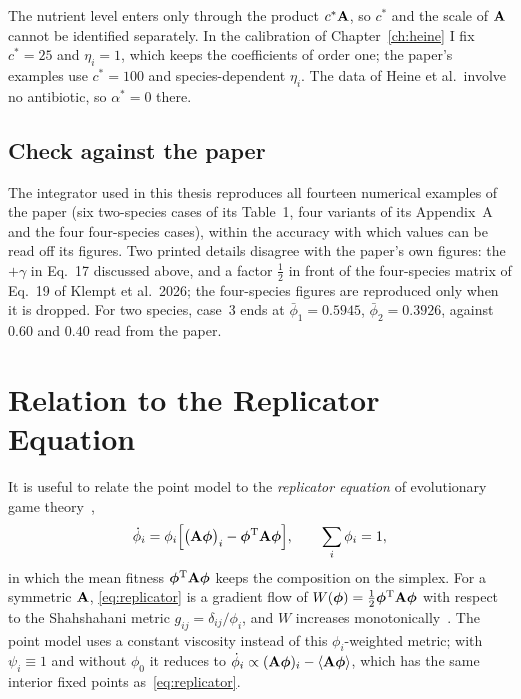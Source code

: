 The nutrient level enters only through the product $c^*\mathbf{A}$, so $c^*$ and the
scale of $\mathbf{A}$ cannot be identified separately. In the calibration of
Chapter~\ref{ch:heine} I fix $c^*=25$ and $\eta_i=1$, which keeps the
coefficients of order one; the paper's examples use $c^*=100$ and
species-dependent $\eta_i$. The data of Heine et al.\ involve no antibiotic,
so $\alpha^*=0$ there.

\subsection{Check against the paper}
\label{sec:theory_point_check}

The integrator used in this thesis reproduces all fourteen numerical examples
of the paper (six two-species cases of its Table~1, four variants of its
Appendix~A and the four four-species cases), within the accuracy with which
values can be read off its figures. Two printed details disagree with the
paper's own figures: the $+\gamma$ in Eq.~17 discussed above, and a factor
$\tfrac12$ in front of the four-species matrix of Eq.~19 of Klempt et al.\ 2026;
the four-species figures are reproduced only when it is dropped. For two species, case~3 ends at
$\bar\phi_1=0.5945$, $\bar\phi_2=0.3926$, against $0.60$ and $0.40$ read
from the paper.

\section{Relation to the Replicator Equation}
\label{sec:theory_replicator}

It is useful to relate the point model to the \emph{replicator equation} of
evolutionary game theory~\cite{Hofbauer1998EGT,TaylorJonker1978Replicator},
\begin{equation}
  \dot{\phi}_i = \phi_i \Bigl[ \bigl(\mathbf{A}\boldsymbol{\phi}\bigr)_i - \boldsymbol{\phi}^{\rm T} \mathbf{A} \boldsymbol{\phi} \Bigr],
  \qquad \sum_i \phi_i = 1,
  \label{eq:replicator}
\end{equation}
in which the mean fitness $\boldsymbol{\phi}^{\rm T}\mathbf{A}\boldsymbol{\phi}$ keeps the composition on the
simplex. For a symmetric $\mathbf{A}$, \eqref{eq:replicator} is a gradient flow of
$W(\boldsymbol{\phi})=\tfrac12\boldsymbol{\phi}^{\rm T}\mathbf{A}\boldsymbol{\phi}$ with respect to the Shahshahani metric
$g_{ij}=\delta_{ij}/\phi_i$, and $W$ increases monotonically~\cite{Hofbauer1998EGT, Shahshahani1979}.
The point model uses a constant viscosity instead of this $\phi_i$-weighted
metric; with $\psi_i\equiv1$ and without $\phi_0$ it reduces to
$\dot\phi_i\propto(\mathbf{A}\boldsymbol{\phi})_i-\langle\mathbf{A}\boldsymbol{\phi}\rangle$, which has the same
interior fixed points as~\eqref{eq:replicator}.

